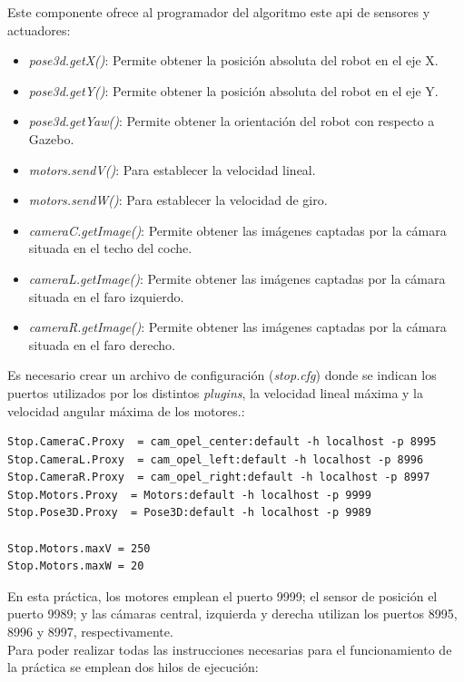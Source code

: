 Este componente ofrece al programador del algoritmo este \acrshort{api} de sensores y actuadores:

\begin{itemize}
\item 	\textit{pose3d.getX()}: Permite obtener la posición absoluta del robot en el eje X.
\item	\textit{pose3d.getY()}: Permite obtener la posición absoluta del robot en el eje Y.
\item	\textit{pose3d.getYaw()}: Permite obtener la orientación del robot con respecto a Gazebo.
\item 	\textit{motors.sendV()}: Para establecer la velocidad lineal.
\item	\textit{motors.sendW()}: Para establecer la velocidad de giro.
\item	\textit{cameraC.getImage()}: Permite obtener las imágenes captadas por la cámara situada en el techo del coche.
\item	\textit{cameraL.getImage()}: Permite obtener las imágenes captadas por la cámara situada en el faro izquierdo.
\item	\textit{cameraR.getImage()}: Permite obtener las imágenes captadas por la cámara situada en el faro derecho.
\end{itemize}

Es necesario crear un archivo de configuración (\textit{stop.cfg}) donde se indican los puertos utilizados por los distintos \textit{plugins}, la velocidad lineal máxima y la velocidad angular máxima de los motores.:

\vspace{20pt}
	\begin{lstlisting}[frame=single]
Stop.CameraC.Proxy  = cam_opel_center:default -h localhost -p 8995
Stop.CameraL.Proxy  = cam_opel_left:default -h localhost -p 8996
Stop.CameraR.Proxy  = cam_opel_right:default -h localhost -p 8997
Stop.Motors.Proxy  = Motors:default -h localhost -p 9999
Stop.Pose3D.Proxy  = Pose3D:default -h localhost -p 9989

Stop.Motors.maxV = 250
Stop.Motors.maxW = 20
	\end{lstlisting}

En esta práctica, los motores emplean el puerto 9999; el sensor de posición el puerto 9989; y las cámaras central, izquierda y derecha utilizan los puertos 8995, 8996 y 8997, respectivamente. \\

Para poder realizar todas las instrucciones necesarias para el funcionamiento de la práctica se emplean dos hilos de ejecución:

